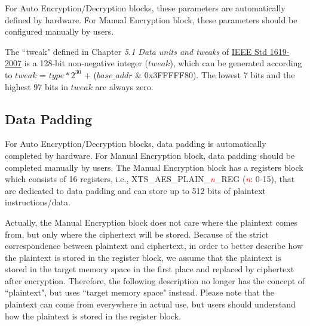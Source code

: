 \documentclass[main\_\_EN.tex]{subfiles}
\begin{document}
For Auto Encryption/Decryption blocks, these parameters are automatically defined by hardware. For Manual Encryption block, these parameters should be configured manually by users.

\begin{tiplisting}
\vspace{-2em}
\begin{enumerate}
    The ``tweak" defined in Chapter \textit{5.1 Data units and tweaks} of \href{https://ieeexplore.ieee.org/document/4493450}{IEEE Std 1619-2007} is a 128-bit non-negative integer (\begin{math} tweak \end{math}), which can be generated according to \begin{math} tweak \end{math} = \begin{math} type * 2^{30}\end{math} + (\begin{math} base\_addr \end{math} \& 0x{}3FFFFF80). The lowest 7 bits and the highest 97 bits in \begin{math} tweak \end{math} are always zero.
\end{enumerate}
\end{tiplisting}

\subsection{Data Padding}
\label{sec:extmemncr-data-writing}

For Auto Encryption/Decryption blocks, data padding is automatically completed by hardware. For Manual Encryption block, data padding should be completed manually by users. The Manual Encryption block has a registers block which consists of 16 registers, i.e., XTS\_AES\_PLAIN\_\textcolor{red}{\it{n}}\_REG (\textcolor{red}{\it{n}}: 0-15), that are dedicated to data padding and can store up to 512 bits of plaintext instructions/data.

Actually, the Manual Encryption block does not care where the plaintext comes from, but only where the ciphertext will be stored. Because of the strict correspondence between plaintext and ciphertext, in order to better describe how the plaintext is stored in the register block, we assume that the plaintext is stored in the target memory space in the first place and replaced by ciphertext after encryption. Therefore, the following description no longer has the concept of ``plaintext", but uses ``target memory space" instead. Please note that the plaintext can come from everywhere in actual use, but users should understand how the plaintext is stored in the register block.
\end{document}
